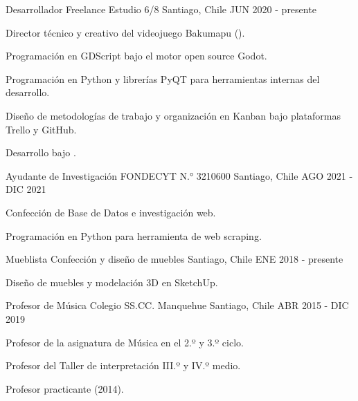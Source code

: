 

\begin{cventries}

  \cventry
    {Desarrollador Freelance} %
    {Estudio 6/8} %
    {Santiago, Chile} %
    {JUN 2020 - presente} %
    {
      \begin{cvitems} %
        \item {Director técnico y creativo del videojuego Bakumapu ().}
        \item {Programación en GDScript bajo el motor open source Godot.}
        \item {Programación en Python y librerías PyQT para herramientas internas del desarrollo.}
        \item {Diseño de metodologías de trabajo y organización en Kanban bajo plataformas Trello y GitHub.}
        \item {Desarrollo bajo .}
      \end{cvitems}
    }

  \cventry
    {Ayudante de Investigación} %
    {FONDECYT N.° 3210600} %
    {Santiago, Chile} %
    {AGO 2021 - DIC 2021} %
    {
      \begin{cvitems} %
        \item {Confección de Base de Datos e investigación web.}
        \item {Programación en Python para herramienta de web scraping.}
      \end{cvitems}
    }

  \cventry
    {Mueblista} %
    {Confección y diseño de muebles} %
    {Santiago, Chile} %
    {ENE 2018 - presente} %
    {
      \begin{cvitems} %
        \item {Diseño de muebles y modelación 3D en SketchUp.}
      \end{cvitems}
    }

  \cventry
    {Profesor de Música} %
    {Colegio SS.CC. Manquehue} %
    {Santiago, Chile} %
    {ABR 2015 - DIC 2019} %
    {
      \begin{cvitems} %
        \item {Profesor de la asignatura de Música en el 2.º y 3.º ciclo.}
        \item {Profesor del Taller de interpretación III.º y IV.º medio.}
        \item {Profesor practicante (2014).}
      \end{cvitems}
    }


\end{cventries}
